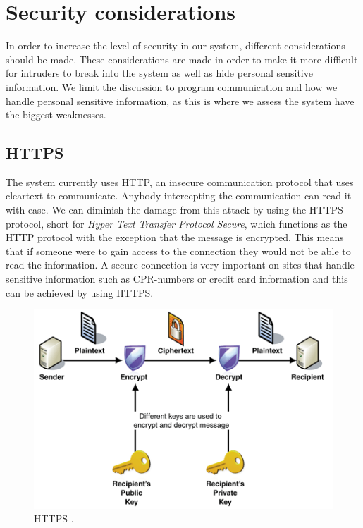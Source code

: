\section{Security considerations}
In order to increase the level of security in our system, different considerations should be made. These considerations are made in order to make it more difficult for intruders to break into the system as well as hide personal sensitive information. We limit the discussion to program communication and how we handle personal sensitive information, as this is where we assess the system have the biggest weaknesses.
 

\subsection*{HTTPS} 
The system currently uses HTTP, an insecure communication protocol that uses cleartext to communicate. Anybody intercepting the communication can read it with ease. We can diminish the damage from this attack by using the HTTPS protocol, short for \textit{Hyper Text Transfer Protocol Secure}, which functions as the HTTP protocol with the exception that the message is encrypted. This means that if someone were to gain access to the connection they would not be able to read the information. A secure connection is very important on sites that handle sensitive information such as CPR-numbers or credit card information and this can be achieved by using HTTPS\cite{HTTPS}.

\begin{figure}[ht]
	\begin{center}
		\includegraphics[scale=0.9]{graphics/HTTPS.png}
		\caption{HTTPS \cite{https_pic}.}
		\label{fig:HTTPS}
	\end{center} 
\end{figure}

